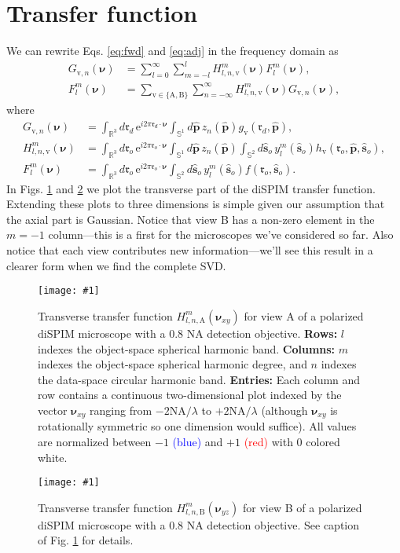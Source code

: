 \documentclass[11pt]{article}
\newcommand{\me}{\mathrm{e}}
\providecommand{\ro}{\mathbf{\mathfrak{r}}_o}
\providecommand{\so}{\mathbf{\hat{s}}_o}
\providecommand{\rd}{\mathbf{\mathfrak{r}}_d}
\providecommand{\mh}[1]{\mathbf{\hat{#1}}}
\providecommand{\mbb}[1]{\mathbb{#1}}
\providecommand{\bs}[1]{\boldsymbol{#1}}
\providecommand{\tv}{\text{v}}
\providecommand{\tx}[1]{\text{#1}}
\providecommand{\bv}{\bs{\nu}}
\providecommand{\p}{\mh{p}}
\providecommand{\lmsum}{\sum_{l=0}^\infty\sum_{m=-l}^{l}}
\providecommand{\intr}[1]{\int_{\mbb{R}^{#1}}}
\providecommand{\ints}[1]{\int_{\mbb{S}^{#1}}}
\providecommand{\fig}[4]{
\begin{figure}[h]
 \captionsetup{width=1.0\linewidth}
 \centering
 \texttt{[image: \#1]}
 \caption{#3}
 \label{fig:#4}
\end{figure}
}
\begin{document}
\section{Transfer function}
We can rewrite Eqs. \ref{eq:fwd} and \ref{eq:adj} in the frequency domain as
\begin{align}
  G_{\tv, n}(\bv) &= \lmsum H_{l,n,\tv}^{m}(\bv)F_l^m(\bv), \label{eq:ffwd}\\
  F_l^m(\bv) &= \sum_{\tv \in \{\tx{A}, \tx{B}\}}\sum_{n=-\infty}^\infty H_{l,n,\tv}^{m}(\bv)G_{\tv, n}(\bv) \label{eq:fadj},
\end{align}
where
\begin{align}
  G_{\tv, n}(\bv) &= \intr{3}d\rd\, \me^{i2\pi\rd\cdot\bv}\ints{1}d\p\, z_n(\p) g_{\tv}(\rd, \p),\\
  H_{l,n,\tv}^m(\bv) &= \intr{3}d\ro\, \me^{i2\pi\ro\cdot\bv}\ints{1}d\p\, z_n(\p)\ints{2}d\so\, y_l^m(\so) h_{\tv}(\ro, \p, \so),\\
  F_l^m(\bv) &= \intr{3}d\ro\, \me^{i2\pi\ro\cdot\bv}\ints{2}d\so\, y_l^m(\so) f(\ro, \so).
\end{align}
In Figs. \ref{fig:tfA} and \ref{fig:tfB} we plot the transverse part of the
diSPIM transfer function. Extending these plots to three dimensions is simple
given our assumption that the axial part is Gaussian. Notice that view B has a
non-zero element in the $m=-1$ column---this is a first for the microscopes
we've considered so far. Also notice that each view contributes new
information---we'll see this result in a clearer form when we find the complete
SVD.

\fig{../calculations/out2/Hillx.pdf}{1.0}{Transverse transfer function
  $H_{l,n,\tx{A}}^m(\bv_{xy})$ for view A of a polarized diSPIM microscope with
  a 0.8 NA detection objective. \textbf{Rows:} $l$ indexes the object-space
  spherical harmonic band. \textbf{Columns:} $m$ indexes the object-space
  spherical harmonic degree, and $n$ indexes the data-space circular harmonic
  band. \textbf{Entries:} Each column and row contains a continuous
  two-dimensional plot indexed by the vector $\bs{\nu}_{xy}$ ranging from
  $-2\text{NA}/\lambda$ to $+2\text{NA}/\lambda$ (although $\bs{\nu}_{xy}$ is
  rotationally symmetric so one dimension would suffice). All values are
  normalized between $-1$ \textcolor{blue}{(blue)} and $+1$
  \textcolor{red}{(red)} with $0$ colored white.}{tfA}

\fig{../calculations/out2/Hillz.pdf}{1.0}{Transverse transfer function
  $H_{l,n,\tx{B}}^m(\bv_{yz})$ for view B of a polarized diSPIM microscope with
  a 0.8 NA detection objective. See caption of Fig. \ref{fig:tfA} for
  details.}{tfB}
\end{document}
